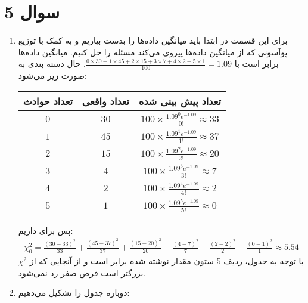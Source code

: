 \section*{سوال 5}
\begin{enumerate}
    \item برای این قسمت در ابتدا باید میانگین داده‌ها را بدست بیاریم و به کمک
    با توزیع پوآسونی که از میانگین داده‌ها پیروی می‌کند مسئله را حل کنیم.
    میانگین داده‌ها برابر است با
    $\frac{0\times30 + 1 \times 45 + 2 \times 15 + 3 \times 7 + 4 \times 2 + 5 \times 1}{100} = 1.09$.
    حال دسته بندی به صورت زیر می‌شود:
    \begin{center}
    \begin{tabular}{|c|c|c|}
        \hline
        تعداد حوادث & تعداد واقعی & تعداد پیش بینی شده\\
        \hline
        $0$ & $30$ & $100 \times \frac{1.09^0 e^{-1.09}}{0!} \approx 33$\\
        \hline
        $1$ & $45$ & $100 \times \frac{1.09^1 e^{-1.09}}{1!} \approx 37$ \\
        \hline
        $2$ & $15$ & $100 \times \frac{1.09^2 e^{-1.09}}{2!} \approx 20$ \\
        \hline
        $3$ & $4$ & $100 \times \frac{1.09^3 e^{-1.09}}{3!} \approx 7$ \\
        \hline
        $4$ & $2$ & $100 \times \frac{1.09^4 e^{-1.09}}{4!} \approx 2$ \\
        \hline
        $5$ & $1$ & $100 \times \frac{1.09^5 e^{-1.09}}{5!} \approx 0$ \\
        \hline
    \end{tabular}
    \end{center}
    پس برای
    داریم:
    \begin{gather*}
        \chi^2_0 = \frac{(30 - 33)^2}{33} + \frac{(45 - 37)^2}{37} + \frac{(15 - 20)^2}{20} + \frac{(4 - 7)^2}{7} + \frac{(2 - 2)^2}{2} + \frac{(0 - 1)^2}{1} \approx 5.54
    \end{gather*}
    با توجه به
    جدول، ردیف 5 ستون
    مقدار نوشته شده برابر
    است و از آنجایی که از
    $\chi^2$
    بزرگتر است فرض صفر رد نمی‌شود.
    \item دوباره جدول را تشکیل می‌دهیم:
    \begin{center}
        \begin{tabular}{|c|c|c|}

\end{tabular}
\end{center}
\end{enumerate}
